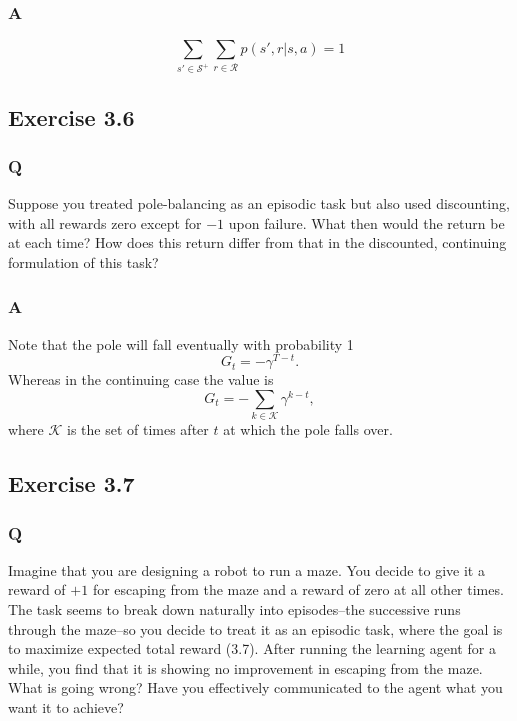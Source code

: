 \subsubsection*{A}
\begin{equation}
    \sum_{s' \in \mathcal{S}^{+}} \sum_{r \in \mathcal{R}} p(s', r | s, a) = 1
\end{equation}


\subsection{Exercise 3.6}
\subsubsection*{Q}
Suppose you treated pole-balancing as an episodic task but also used discounting, with all rewards zero except for $-1$ upon failure. What then would the return be at each time? How does this return differ from that in the discounted, continuing formulation of this task?

\subsubsection*{A}
Note that the pole will fall eventually with probability 1
\begin{equation}
    G_t = - \gamma^{T - t}.
\end{equation}
Whereas in the continuing case the value is
\begin{equation}
    G_t = - \sum_{k \in \mathcal{K}} \gamma^{k - t},
\end{equation}
where $\mathcal{K}$ is the set of times after $t$ at which the pole falls over.

\subsection{Exercise 3.7}
\subsubsection*{Q}
Imagine that you are designing a robot to run a maze. You decide to give it a reward of $+1$ for escaping from the maze and a reward of zero at all other times. The task seems to break down naturally into episodes--the successive runs through the maze--so you decide to treat it as an episodic task, where the goal is to maximize expected total reward (3.7). After running the learning agent for a while, you find that it is showing no improvement in escaping from the maze. What is going wrong? Have you effectively communicated to the agent what you want it to achieve?

